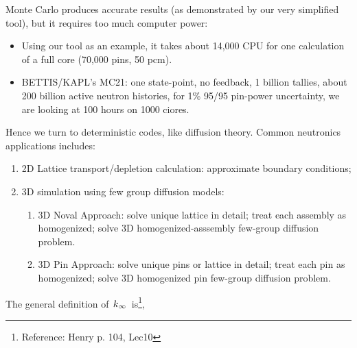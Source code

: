 \documentclass{school-22.211-notes}
\date{March 14, 2012}
\begin{document}
\maketitle

Monte Carlo produces accurate results (as demonstrated by our very simplified tool), but it requires too much computer power:
\begin{itemize}
\item Using our tool as an example, it takes about 14,000 CPU for one calculation of a full core (70,000 pins, 50 pcm). 
\item BETTIS/KAPL's MC21: one state-point, no feedback, 1 billion tallies, about 200 billion active neutron histories, for 1\% 95/95 pin-power uncertainty, we are looking at 100 hours on 1000 ciores. 
\end{itemize}

Hence we turn to deterministic codes, like diffusion theory. Common neutronics applications includes: 
\begin{enumerate}
\item 2D Lattice transport/depletion calculation: approximate boundary conditions;
\item 3D simulation using few group diffusion models: 
  \begin{enumerate}
  \item 3D Noval Approach: solve unique lattice in detail; treat each assembly as homogenized; solve 3D homogenized-asssembly few-group diffusion problem. 
  \item 3D Pin Approach: solve unique pins or lattice in detail; treat each pin as homogenized; solve 3D homogenized pin few-group diffusion problem. 
  \end{enumerate}
\end{enumerate}


\clearpage
{}
The general definition of $\left. k_{\infty} \right.$ is\footnote{Reference: Henry p. 104, Lec10},
\end{document}
